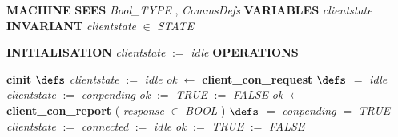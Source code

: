 %
\bsetindent
\begin{tabbing}
\bSetTabs
%
%
\bbnl
{\bf MACHINE} \bhsp{} \-\label{Client}
%
%
\bbnl
{\bf SEES} \+ \bbnl
{\em Bool\_TYPE\/}\label{Bool_TYPE}  , {\em CommsDefs\/}\label{CommsDefs}  \-
%
%
\bbnl
{\bf VARIABLES} \+ \bbnl
{\em clientstate\/}\label{clientstate}  \-
%
%
\bbnl
{\bf INVARIANT} \+ \bbnl
{\em clientstate\/} $\in$ {\em STATE\/}\label{STATE}
\end{tabbing}
\bresetindent
%
%
\vspace{-4.5ex}\bsetindent
\begin{tabbing}
\bSetTabs
\+\> \-
%
%
\bbnl
{\bf INITIALISATION} \+ \bbnl
{\em clientstate\/} $:=$  {\em idle\/} \-
%
%
\bnl\bnl
{\bf OPERATIONS} \+ \bbnl

%
%
{\bf { cinit}}  \bhsp $\defs$ \+ \bnl
{\em clientstate\/} $:=$  {\em idle\/} \- \bOperationSemiColon \bbnl
%
%
{\em ok\/} $\longleftarrow$  {\bf { client\_con\_request}}  \bhsp $\defs$ \+ \bnl
   $=$ {\em idle\/} \- \bhsp {} \+\bnl
{\em clientstate\/} $:=$  {\em conpending\/} \bparallel \bnl
{\em ok\/} $:=$  {\em TRUE\/} \-\bnl
{}  $:=$  {\em FALSE\/} \-\bnl
{}  \- \bOperationSemiColon \bbnl
%
%
{\em ok\/} $\longleftarrow$  {\bf { client\_con\_report}} ( {\em response\/} $\in$ {\em BOOL\/}\label{BOOL}  ) \bhsp $\defs$ \+ \bnl
   $=$ {\em conpending\/} \- \bhsp {} \+\bnl
{}  $=$ {\em TRUE\/} \- \bhsp {} \+\bnl
{\em clientstate\/} $:=$  {\em connected\/} \-\bnl
{}  $:=$  {\em idle\/} \-\bnl
{}  \bparallel \bnl
{\em ok\/} $:=$  {\em TRUE\/} \-\bnl
{}  $:=$  {\em FALSE\/} \-\bnl
{}  \-
\end{tabbing}
